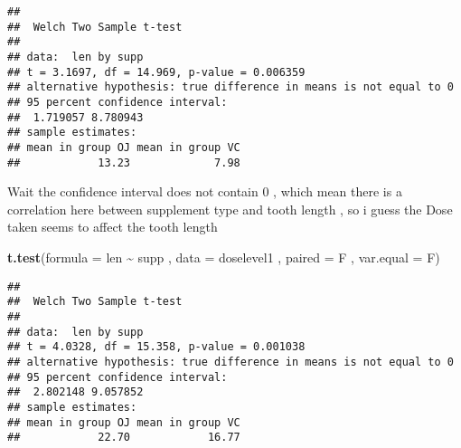 \documentclass[
]{article}
\newenvironment{Shaded}{\begin{snugshade}}{\end{snugshade}}
\newcommand{\DataTypeTok}[1]{\textcolor[rgb]{0.13,0.29,0.53}{#1}}
\newcommand{\KeywordTok}[1]{\textcolor[rgb]{0.13,0.29,0.53}{\textbf{#1}}}
\newcommand{\NormalTok}[1]{#1}
\newcommand{\OperatorTok}[1]{\textcolor[rgb]{0.81,0.36,0.00}{\textbf{#1}}}
\newcommand{\StringTok}[1]{\textcolor[rgb]{0.31,0.60,0.02}{#1}}
\begin{document}
\begin{Shaded}
\end{Shaded}

\begin{verbatim}
## 
##  Welch Two Sample t-test
## 
## data:  len by supp
## t = 3.1697, df = 14.969, p-value = 0.006359
## alternative hypothesis: true difference in means is not equal to 0
## 95 percent confidence interval:
##  1.719057 8.780943
## sample estimates:
## mean in group OJ mean in group VC 
##            13.23             7.98
\end{verbatim}

Wait the confidence interval does not contain 0 , which mean there is a
correlation here between supplement type and tooth length , so i guess
the Dose taken seems to affect the tooth length

\begin{Shaded}
\begin{Highlighting}[]
\KeywordTok{t.test}\NormalTok{(}\DataTypeTok{formula =}\NormalTok{ len }\OperatorTok{\textasciitilde{}}\StringTok{ }\NormalTok{supp , }\DataTypeTok{data =}\NormalTok{ doselevel1 , }\DataTypeTok{paired =}\NormalTok{ F , }\DataTypeTok{var.equal =}\NormalTok{ F)}
\end{Highlighting}
\end{Shaded}

\begin{verbatim}
## 
##  Welch Two Sample t-test
## 
## data:  len by supp
## t = 4.0328, df = 15.358, p-value = 0.001038
## alternative hypothesis: true difference in means is not equal to 0
## 95 percent confidence interval:
##  2.802148 9.057852
## sample estimates:
## mean in group OJ mean in group VC 
##            22.70            16.77
\end{verbatim}
\end{document}
